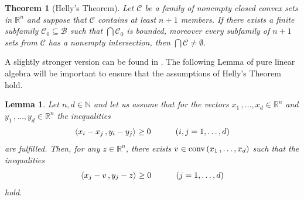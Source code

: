 \documentclass[12pt]{amsart}
\newtheorem{thm}{Theorem}%
\newtheorem{lemm}{Lemma}%
\theoremstyle{remark}
\theoremstyle{definition}
\newcommand{\NN}{\mathbb{N}}
\newcommand{\Rn}{\mathbb{R}^n}
\newcommand{\conv}{\mbox{\rm conv}}
\newcommand{\bsz}[2]{\left \langle #1 \,, #2 \right \rangle}
\begin{document}
\begin{thm}[Helly's Theorem]\label{thm-Helly} 
Let $ \mathcal{C} $ be a family of nonempty 
closed convex sets in $ \Rn $ 
and suppose that 
$ \mathcal{C} $ contains at least 
$ n+1 $ members. 
If there exists a finite subfamily 
$ \mathcal{C}_0 \subseteq \mathcal{B} $ such that 
$ \bigcap \mathcal{C}_0 $ is bounded, moreover 
every subfamily of $ n+1 $ sets 
from $ \mathcal{C} $ has a nonempty intersection, 
then $ \bigcap \mathcal{C} \neq \emptyset $. 
\end{thm}

A slightly stronger version can be found in 
\cite[Corollary 21.3.2]{Roc70}. The following Lemma 
of pure linear algebra 
will be important to ensure 
that the assumptions of Helly's Theorem hold.  

\begin{lemm}\label{lemma-LinAlg1}
Let $ n,d \in \NN $ and let us assume that for the vectors 
$ x_1 \,, \dots , x_d \in \Rn $ and 
$ y_1 \,, \dots , y_d \in \Rn $ the inequalities 
\begin{equation}\label{eq1-lemma-linalg}
\bsz{x_i - x_j}{y_i - y_j} \geq 0 
\hspace{10mm}  
\left( i,j = 1 , \dots , d \right)
\end{equation} 
are fulfilled. Then, for any $ z \in \Rn $, 
there exists $ v \in \conv \left( 
x_1 \,, \dots, x_d \right) $ such that the 
inequalities 
\begin{equation}\label{eq2-lemma-linalg}
\bsz{x_j - v}{y_j - z} \geq 0 
\hspace{10mm} 
\left( j = 1 , \dots , d \right) 
\end{equation} 
hold. 
\end{lemm}
\end{document}
